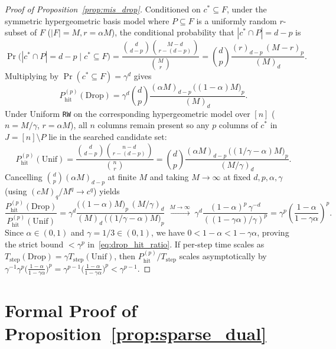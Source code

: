 \documentclass[12pt]{article}
\theoremstyle{definition}
\newcommand{\ttt}[1]{\texttt{#1}}
\begin{document}
\begin{proof}[Proof of Proposition~\ref{prop:mis_drop}]
Conditioned on $c^* \subseteq F$, under the symmetric hypergeometric basis model where $P \subseteq F$ is a
uniformly random $r$-subset of $F$ ($|F| = M, r = \alpha M$), the conditional probability that $|c^* \cap P| = d -
p$ is
\[
  \Pr\bigl(|c^* \cap P| = d - p \;\big|\; c^* \subseteq F\bigr)
  = \frac{\binom{d}{d - p}\binom{M - d}{r - (d - p)}}{\binom{M}{r}}
  = \binom{d}{p} \frac{(r)_{d-p}\,(M - r)_p}{(M)_d}.
\]
Multiplying by $\Pr(c^* \subseteq F) = \gamma^d$ gives
\[
  P_{\mathrm{hit}}^{(p)}(\mathrm{Drop})
  = \gamma^d \binom{d}{p} \frac{(\alpha M)_{d-p}\,\bigl((1 - \alpha) M\bigr)_p}{(M)_d}.
\]
Under Uniform \ttt{RW} on the corresponding hypergeometric model over $[n]$ ($n = M/\gamma$, $r = \alpha M$), all
$n$ columns remain present so any $p$ columns of $c^*$ in $J = [n] \setminus P$ lie in the searched candidate set:
\[
  P_{\mathrm{hit}}^{(p)}(\mathrm{Unif})
  = \frac{\binom{d}{d - p}\binom{n - d}{r - (d - p)}}{\binom{n}{r}}
  = \binom{d}{p} \frac{(\alpha M)_{d-p}\,\bigl((1/\gamma - \alpha) M\bigr)_p}{(M/\gamma)_d}.
\]
Cancelling $\binom{d}{p} (\alpha M)_{d-p}$ at finite $M$ and taking $M \to \infty$ at fixed $d, p, \alpha, \gamma$
(using $(c M)_q / M^q \to c^q$) yields
\[
  \frac{P_{\mathrm{hit}}^{(p)}(\mathrm{Drop})}{P_{\mathrm{hit}}^{(p)}(\mathrm{Unif})}
  = \gamma^d \frac{\bigl((1 - \alpha) M\bigr)_p\,(M/\gamma)_d}{(M)_d\,\bigl((1/\gamma - \alpha) M\bigr)_p}
  \;\xrightarrow{M \to \infty}\;
  \gamma^d \frac{(1 - \alpha)^p\,\gamma^{-d}}{((1 - \gamma\alpha)/\gamma)^p}
  = \gamma^p \left(\frac{1 - \alpha}{1 - \gamma\alpha}\right)^p.
\]
Since $\alpha \in (0, 1)$ and $\gamma = 1/3 \in (0, 1)$, we have $0 < 1 - \alpha < 1 - \gamma\alpha$, proving the
strict bound $< \gamma^p$ in~\eqref{eq:drop_hit_ratio}. If per-step time scales as $T_{\mathrm{step}}(\mathrm{Drop})
= \gamma T_{\mathrm{step}}(\mathrm{Unif})$, then $P_{\mathrm{hit}}^{(p)} / T_{\mathrm{step}}$ scales asymptotically
by $\gamma^{-1} \gamma^p \bigl(\frac{1-\alpha}{1-\gamma\alpha}\bigr)^p = \gamma^{p-1}
\bigl(\frac{1-\alpha}{1-\gamma\alpha}\bigr)^p < \gamma^{p-1}$.
\end{proof}

\section{Formal Proof of \texorpdfstring{Proposition~\ref{prop:sparse_dual}}{Proposition 3}}\label{app:dual_proof}
\end{document}
